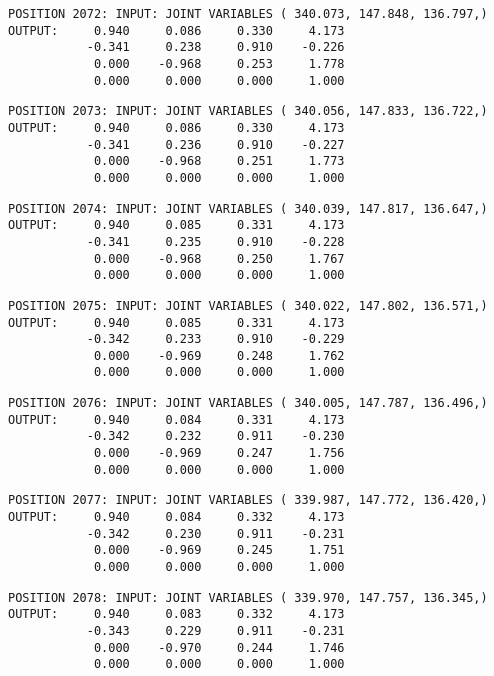 \begin{verbatim}
POSITION 2072: INPUT: JOINT VARIABLES ( 340.073, 147.848, 136.797,)
OUTPUT:     0.940     0.086     0.330     4.173
           -0.341     0.238     0.910    -0.226
            0.000    -0.968     0.253     1.778
            0.000     0.000     0.000     1.000
\end{verbatim} \pagebreak[1]\begin{verbatim}
POSITION 2073: INPUT: JOINT VARIABLES ( 340.056, 147.833, 136.722,)
OUTPUT:     0.940     0.086     0.330     4.173
           -0.341     0.236     0.910    -0.227
            0.000    -0.968     0.251     1.773
            0.000     0.000     0.000     1.000
\end{verbatim} \pagebreak[1]\begin{verbatim}
POSITION 2074: INPUT: JOINT VARIABLES ( 340.039, 147.817, 136.647,)
OUTPUT:     0.940     0.085     0.331     4.173
           -0.341     0.235     0.910    -0.228
            0.000    -0.968     0.250     1.767
            0.000     0.000     0.000     1.000
\end{verbatim} \pagebreak[1]\begin{verbatim}
POSITION 2075: INPUT: JOINT VARIABLES ( 340.022, 147.802, 136.571,)
OUTPUT:     0.940     0.085     0.331     4.173
           -0.342     0.233     0.910    -0.229
            0.000    -0.969     0.248     1.762
            0.000     0.000     0.000     1.000
\end{verbatim} \pagebreak[1]\begin{verbatim}
POSITION 2076: INPUT: JOINT VARIABLES ( 340.005, 147.787, 136.496,)
OUTPUT:     0.940     0.084     0.331     4.173
           -0.342     0.232     0.911    -0.230
            0.000    -0.969     0.247     1.756
            0.000     0.000     0.000     1.000
\end{verbatim} \pagebreak[1]\begin{verbatim}
POSITION 2077: INPUT: JOINT VARIABLES ( 339.987, 147.772, 136.420,)
OUTPUT:     0.940     0.084     0.332     4.173
           -0.342     0.230     0.911    -0.231
            0.000    -0.969     0.245     1.751
            0.000     0.000     0.000     1.000
\end{verbatim} \pagebreak[1]\begin{verbatim}
POSITION 2078: INPUT: JOINT VARIABLES ( 339.970, 147.757, 136.345,)
OUTPUT:     0.940     0.083     0.332     4.173
           -0.343     0.229     0.911    -0.231
            0.000    -0.970     0.244     1.746
            0.000     0.000     0.000     1.000
\end{verbatim} \pagebreak[1]\begin{verbatim}

\end{verbatim}
